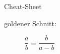 \begin{TOP}{Cheat-Sheet}
\up\up
	\begin{description}
		\item[goldener Schnitt:] $\dfrac{a}{b}=\dfrac{b}{a-b}$
	\end{description}
\end{TOP}